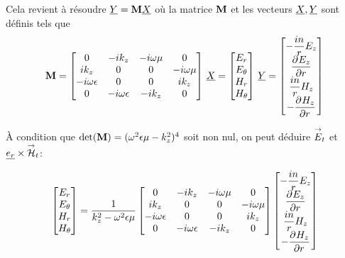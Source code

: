 Cela revient à résoudre $\v{Y}= \mat{M}\v{X}$ où la matrice $\mat{M}$ et les vecteurs $\v{X}, \v{Y}$ sont définis tels que
\begin{equation}
    \mat{M} =
    \begin{bmatrix}
    0 & -ik_z & -i\w\mu & 0 
    \\
    ik_z & 0 & 0 & -i\w\mu
    \\
    -i\w\eps & 0 & 0 & ik_z
    \\
    0 & -i\w\eps & -ik_z & 0
    \end{bmatrix}
    \,
    \v{X} = 
    \begin{bmatrix}
        E_r\\
        E_\theta\\
        H_r\\
        H_\theta
    \end{bmatrix}
    \,
    \v{Y} = 
    \begin{bmatrix}
        -\frac{in}{r}E_z\\
        \ddr{r}{E_z}\\
        \frac{in}{r}H_z\\
        -\ddr{r}{H_z}
    \end{bmatrix}
\end{equation}

À condition que $\det(\mat{M}) = (\w^2\eps\mu-k_z^2)^4$ soit non nul, on peut déduire $\vE_t$ et $\v{e_r}\times \vH_t$:

\begin{equation}
    \begin{bmatrix}
        E_r\\
        E_\theta\\
        H_r\\
        H_\theta
    \end{bmatrix} =
    \frac{1}{k_z^2 - \w^2\eps\mu}
    \begin{bmatrix}
    0 & -ik_z & -i\w\mu & 0 
    \\
    ik_z & 0 & 0 & -i\w\mu
    \\
    -i\w\eps & 0 & 0 & ik_z
    \\
    0 & -i\w\eps & -ik_z & 0
    \end{bmatrix}
    \begin{bmatrix}
        -\frac{in}{r}E_z\\
        \ddr{r}{E_z}\\
        \frac{in}{r}H_z\\
        -\ddr{r}{H_z}
    \end{bmatrix}
\end{equation}

